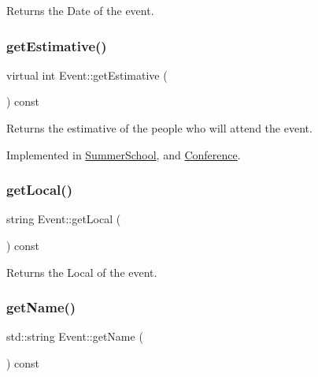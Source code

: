 Returns the Date of the event. 

\mbox{\label{classEvent_a18ac55c239f648fc0ad5687c426f2a8f}} 
\subsubsection{\texorpdfstring{get\+Estimative()}{getEstimative()}}
{\footnotesize\ttfamily virtual int Event\+::get\+Estimative (\begin{DoxyParamCaption}{ }\end{DoxyParamCaption}) const\hspace{0.3cm}{\ttfamily [pure virtual]}}



Returns the estimative of the people who will attend the event. 



Implemented in \mbox{\hyperlink{classSummerSchool_a019b9e38108b7dd31cd93cab285d0d00}{Summer\+School}}, and \mbox{\hyperlink{classConference_a9d96f80eb37bdbf57bf318c8bd484e88}{Conference}}.

\mbox{\label{classEvent_aa2b3aee8416f68b890083a09eecfea8b}} 
\subsubsection{\texorpdfstring{get\+Local()}{getLocal()}}
{\footnotesize\ttfamily string Event\+::get\+Local (\begin{DoxyParamCaption}{ }\end{DoxyParamCaption}) const}



Returns the Local of the event. 

\mbox{\label{classEvent_a36453ab5a21b660a61f2a0369e2689e8}} 
\subsubsection{\texorpdfstring{get\+Name()}{getName()}}
{\footnotesize\ttfamily std\+::string Event\+::get\+Name (\begin{DoxyParamCaption}{ }\end{DoxyParamCaption}) const\hspace{0.3cm}{\ttfamily [inline]}}



